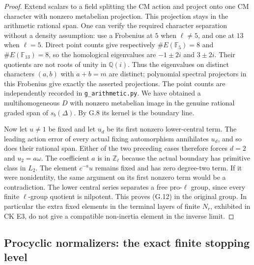 \begin{proof}
Extend scalars to a field splitting the CM action and project
onto one CM character with nonzero metabelian projection.
This projection stays in the arithmetic rational span. One can
verify the required character separation without a density
assumption: use a Frobenius at $5$ when $\ell\ne5$, and one at
$13$ when $\ell=5$. Direct point counts give respectively
$\#E(\mathbb F_5)=8$ and $\#E(\mathbb F_{13})=8$, so the
homological eigenvalues are $-1\pm2i$ and $3\pm2i$.
Their quotients are not roots of unity in $\mathbb Q(i)$.
Thus the eigenvalues on distinct characters $(a,b)$ with
$a+b=m$ are distinct; polynomial spectral projectors in this
Frobenius give exactly the asserted projections. The point
counts are independently recorded in \texttt{g\_arithmetic.py}.
We have obtained a multihomogeneous $D$ with nonzero metabelian
image in the genuine rational graded span of $s_b(\Delta)$.
By G.8 its kernel is the boundary line.

Now let $u\ne1$ be fixed and let $u_d$ be its first nonzero
lower-central term. The leading action error of every actual
fixing automorphism annihilates $u_d$, and so does their rational
span. Either of the two preceding cases therefore forces
$d=2$ and $u_2=a\omega$. The coefficient $a$ is in
$\mathbb Z_\ell$ because the actual boundary has primitive
class in $L_2$. The element $c^{-a}u$ remains fixed and has
zero degree-two term. If it were nonidentity, the same argument
on its first nonzero term would be a contradiction. The lower
central series separates a free pro-$\ell$ group, since every
finite $\ell$-group quotient is nilpotent. This proves (G.12)
in the original group. In particular the extra fixed elements
in the terminal layers of finite $N_r$, exhibited in CK E3,
do not give a compatible non-inertia element in the inverse limit.
\end{proof}

\subsection{Procyclic normalizers: the exact finite stopping level}

